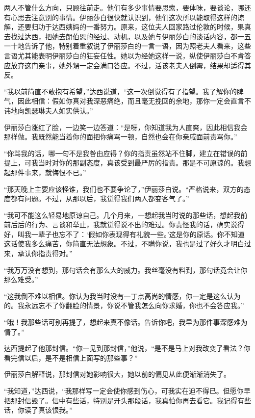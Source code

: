 \par 两人不管什么方向，只顾往前走。他们有多少事情要思索，要体味，要谈论，哪还有心思去注意别的事情。伊丽莎白很快就认识到，他们这次所以能取得这样的谅解，还要归功于达西姨妈的一番努力。原来，这位夫人回家路过伦敦的时候，果真去找过达西，把她去朗伯恩的经过、动机，以及她与伊丽莎白的谈话内容，都一五一十地告诉了他，特别着重叙说了伊丽莎白的一言一语，因为照老夫人看来，这些言语尤其能表明伊丽莎白的狂妄任性。她以为经她这样一说，纵使伊丽莎白不肯答应放弃这门亲事，她外甥一定会满口答应。不过，活该老夫人倒霉，结果却适得其反。
\par “我以前简直不敢抱有希望，”达西说道，“这一次倒觉得有了指望。我了解你的脾气，因此相信：假如你真对我深恶痛绝，而且毫无挽回的余地，那你一定会直言不讳地向凯瑟琳夫人如实供认。”
\par 伊丽莎白涨红了脸，一边笑一边答道：“是呀，你知道我为人直爽，因此相信我会那样做。我既然能当着你的面把你痛骂一顿，自然也会在你亲戚面前责骂你。”
\par “你骂我的话，哪一句不是我咎由应得？你的指责虽然站不住脚，建立在错误的前提上，可我当时对你的那副态度，真该受到最严厉的指责。那是不可原谅的。我想起那件事来，就悔恨不已。”
\par “那天晚上主要应该怪谁，我们也不要争论了，”伊丽莎白说。“严格说来，双方的态度都有问题。不过，从那以后，我觉得我们两人都变客气了。”
\par “我可不能这么轻易地原谅自己。几个月来，一想起我当时说的那些话，想起我前前后后的行为、言谈和举止，我就觉得说不出的难过。你责怪我的话，确实说得好，叫我一辈子也忘不了：‘假如你表现得有礼貌一些。’这是你的原话。你不知道这话使我多么痛苦，你简直无法想象。不过，不瞒你说，我也是过了好久才明白过来，承认你指责得对。”
\par “我万万没有想到，那句话会有那么大的威力。我丝毫没有料到，那句话竟会让你那么难受。”
\par “这我倒不难以相信。你认为我当时没有一丁点高尚的情感，你一定是这么认为的。我永远忘不了你翻脸的情景，你说不管我怎么向你求婚，你也不会答应我。”
\par “哦！我那些话可别再提了，想起来真不像话。告诉你吧，我早为那件事深感难为情了。”
\par 达西提起了他那封信。“你一见到那封信，”他说，“是不是马上对我改变了看法？你看完信以后，是不是相信上面写的那些事？”
\par 伊丽莎白解释说，那封信对她影响很大，她以前的偏见从此便渐渐消失了。
\par “我知道，”达西说，“我那样写一定会使你感到伤心，可我实在迫不得已。但愿你早把那封信毁了。信中有些话，特别是开头那段话，我真怕你再去看它。我记得有些话，你读了真该恨我。”
